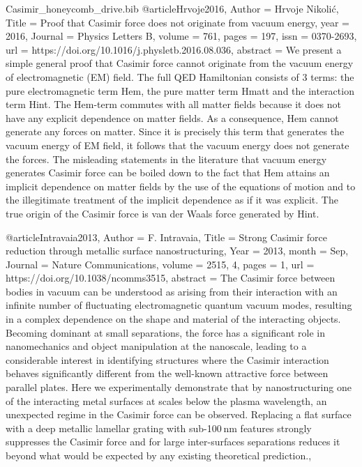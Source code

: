 \documentclass[twoside, 10pt, ptm]{article}
\def\myfilename{Casimir_honeycomb_drive}
\begin{document}
\begin{multicols}{2}
\begin{filecontents}{\myfilename.bib}
@article{Hrvoje2016,
    Author = {Hrvoje Nikolić},
    Title = {Proof that Casimir force does not originate from vacuum energy},
    year = {2016},
    Journal = {Physics Letters B},
    volume = {761},
    pages = {197},
    issn = {0370-2693},
    url = {https://doi.org/10.1016/j.physletb.2016.08.036},
    abstract = {We present a simple general proof that Casimir force cannot originate from the vacuum energy of electromagnetic (EM) field. The full QED Hamiltonian consists of 3 terms: the pure electromagnetic term Hem, the pure matter term Hmatt and the interaction term Hint. The Hem-term commutes with all matter fields because it does not have any explicit dependence on matter fields. As a consequence, Hem cannot generate any forces on matter. Since it is precisely this term that generates the vacuum energy of EM field, it follows that the vacuum energy does not generate the forces. The misleading statements in the literature that vacuum energy generates Casimir force can be boiled down to the fact that Hem attains an implicit dependence on matter fields by the use of the equations of motion and to the illegitimate treatment of the implicit dependence as if it was explicit. The true origin of the Casimir force is van der Waals force generated by Hint.}
}




@article{Intravaia2013,
    Author = {F. Intravaia},
    Title = {Strong Casimir force reduction through metallic surface nanostructuring},
    Year = {2013},
    month = {Sep},
    Journal = {Nature Communications},
    volume = {2515, 4},
    pages = {1},
    url = {https://doi.org/10.1038/ncomms3515},
    abstract = {The Casimir force between bodies in vacuum can be understood as arising from their interaction with an infinite number of fluctuating electromagnetic quantum vacuum modes, resulting in a complex dependence on the shape and material of the interacting objects. Becoming dominant at small separations, the force has a significant role in nanomechanics and object manipulation at the nanoscale, leading to a considerable interest in identifying structures where the Casimir interaction behaves significantly different from the well-known attractive force between parallel plates. Here we experimentally demonstrate that by nanostructuring one of the interacting metal surfaces at scales below the plasma wavelength, an unexpected regime in the Casimir force can be observed. Replacing a flat surface with a deep metallic lamellar grating with sub-100 nm features strongly suppresses the Casimir force and for large inter-surfaces separations reduces it beyond what would be expected by any existing theoretical prediction.},
}


\end{filecontents}
\end{multicols}
\end{document}
